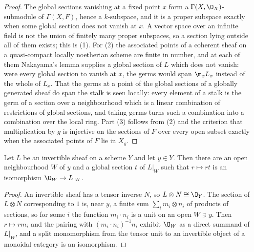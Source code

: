 \begin{proof}
\leanok
The global sections vanishing at a fixed point $x$ form a
$\Gamma(X,\O_X)$-submodule of $\Gamma(X,F)$, hence a $k$-subspace, and it is a
proper subspace exactly when some global section does not vanish at $x$.  A
vector space over an infinite field is not the union of finitely many proper
subspaces, so a section lying outside all of them exists; this is (1).  For (2)
the associated points of a coherent sheaf on a quasi-compact locally noetherian
scheme are finite in number, and at each of them Nakayama's lemma supplies a
global section of $L$ which does not vanish: were every global section to
vanish at $x$, the germs would span $\m_xL_x$ instead of the whole of $L_x$.
That the germs at a point of the global sections of a globally generated sheaf
do span the stalk is seen locally: every element of a stalk is the germ of a
section over a neighbourhood which is a linear combination of restrictions of
global sections, and taking germs turns such a combination into a combination
over the local ring.
Part (3) follows from (2) and the criterion that multiplication by $g$ is
injective on the sections of $F$ over every open subset exactly when the
associated points of $F$ lie in $X_g$.
\end{proof}

\begin{lemma}
\label{lem:deg-invertible-locally-trivial}
\leanok
Let $L$ be an invertible sheaf on a scheme $Y$ and let $y\in Y$.  Then there
are an open neighbourhood $W$ of $y$ and a global section $t$ of $L|_W$ such
that $r\mapsto rt$ is an isomorphism $\O_W\to L|_W$.
\end{lemma}
\begin{proof}
\leanok
An invertible sheaf has a tensor inverse $N$, so $L\otimes N\cong\O_Y$.  The
section of $L\otimes N$ corresponding to $1$ is, near $y$, a finite sum
$\sum_im_i\otimes n_i$ of products of sections, so for some $i$ the function
$m_i\cdot n_i$ is a unit on an open $W\ni y$.  Then $r\mapsto rm_i$ and the
pairing with $(m_i\cdot n_i)^{-1}n_i$ exhibit $\O_W$ as a direct summand of
$L|_W$, and a split monomorphism from the tensor unit to an invertible object
of a monoidal category is an isomorphism.
\end{proof}

